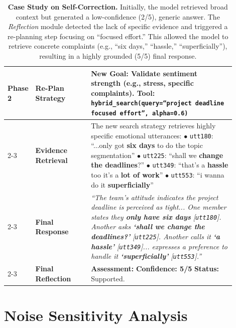 \documentclass[11pt]{article}
\newcommand{\cmark}{\ding{51}}%
\begin{document}
\begin{table}[t]
{\begin{tabular}{l p{0.25\linewidth} p{0.65\linewidth}}
\midrule
\multirow{8}{*}{\textbf{Phase 2}} & \textbf{Re-Plan Strategy} & \textbf{New Goal:} Validate sentiment strength (e.g., stress, specific complaints). \newline
\textbf{Tool:} \texttt{hybrid\_search(query=``project deadline focused effort'', alpha=0.6)} \\
\cmidrule(lr){2-3}
& \textbf{Evidence Retrieval} & 
The new search strategy retrieves highly specific emotional utterances: \newline
$\bullet$ \texttt{utt180}: ``...only got \textbf{six days} to do the topic segmentation'' \newline
$\bullet$ \texttt{utt225}: ``shall we \textbf{change the deadlines}?'' \newline
$\bullet$ \texttt{utt349}: ``that's a \textbf{hassle} too it's a \textbf{lot of work}'' \newline
$\bullet$ \texttt{utt553}: ``i wanna do it \textbf{superficially}'' \\
\cmidrule(lr){2-3}
& \cellcolor{bg_success}\textbf{Final Response} & 
\cellcolor{bg_success}\textit{``The team's attitude indicates the project deadline is perceived as tight... One member states they \textbf{only have six days} [\texttt{utt180}]. Another asks \textbf{`shall we change the deadlines?'} [\texttt{utt225}]. Another calls it \textbf{`a hassle'} [\texttt{utt349}]... expresses a preference to handle it \textbf{`superficially'} [\texttt{utt553}].''} \\
\cmidrule(lr){2-3}
& \textbf{Final Reflection} & \textbf{Assessment:} \textcolor{green!60!black}{\cmark \textbf{Confidence: 5/5}} \quad \textbf{Status:} Supported. \\

\bottomrule
\end{tabular}
}
\caption{\textbf{Case Study on Self-Correction.} Initially, the model retrieved broad context but generated a low-confidence (2/5), generic answer. The \textit{Reflection} module detected the lack of specific evidence and triggered a re-planning step focusing on ``focused effort.'' This allowed the model to retrieve concrete complaints (e.g., ``six days,'' ``hassle,'' ``superficially''), resulting in a highly grounded (5/5) final response.}
\label{tab:reflection_case_study}
\end{table}

\section{Noise Sensitivity Analysis}
\label{sec:noise_analysis}
\end{document}
